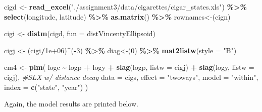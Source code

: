 \documentclass[
  a4paper,
]{article}
\newenvironment{Shaded}{\begin{snugshade}}{\end{snugshade}}
\newcommand{\AttributeTok}[1]{\textcolor[rgb]{0.13,0.29,0.53}{#1}}
\newcommand{\CommentTok}[1]{\textcolor[rgb]{0.56,0.35,0.01}{\textit{#1}}}
\newcommand{\DecValTok}[1]{\textcolor[rgb]{0.00,0.00,0.81}{#1}}
\newcommand{\FloatTok}[1]{\textcolor[rgb]{0.00,0.00,0.81}{#1}}
\newcommand{\FunctionTok}[1]{\textcolor[rgb]{0.13,0.29,0.53}{\textbf{#1}}}
\newcommand{\NormalTok}[1]{#1}
\newcommand{\OtherTok}[1]{\textcolor[rgb]{0.56,0.35,0.01}{#1}}
\newcommand{\SpecialCharTok}[1]{\textcolor[rgb]{0.81,0.36,0.00}{\textbf{#1}}}
\newcommand{\StringTok}[1]{\textcolor[rgb]{0.31,0.60,0.02}{#1}}
\begin{document}
\begin{Shaded}
\begin{Highlighting}[]
\NormalTok{cigd }\OtherTok{\textless{}{-}} \FunctionTok{read\_excel}\NormalTok{(}\StringTok{"./assignment3/data/cigarettes/cigar\_states.xls"}\NormalTok{) }\SpecialCharTok{\%\textgreater{}\%}
    \FunctionTok{select}\NormalTok{(longitude, latitude) }\SpecialCharTok{\%\textgreater{}\%}
    \FunctionTok{as.matrix}\NormalTok{() }\SpecialCharTok{\%\textgreater{}\%}
    \StringTok{\textasciigrave{}}\AttributeTok{rownames\textless{}{-}}\StringTok{\textasciigrave{}}\NormalTok{(cign)}

\NormalTok{cigi }\OtherTok{\textless{}{-}} \FunctionTok{distm}\NormalTok{(cigd, }\AttributeTok{fun =}\NormalTok{ distVincentyEllipsoid)}

\NormalTok{cigj }\OtherTok{\textless{}{-}}\NormalTok{ (cigi}\SpecialCharTok{/}\FloatTok{1e+06}\NormalTok{)}\SpecialCharTok{\^{}}\NormalTok{(}\SpecialCharTok{{-}}\DecValTok{3}\NormalTok{) }\SpecialCharTok{\%\textgreater{}\%}
    \StringTok{\textasciigrave{}}\AttributeTok{diag\textless{}{-}}\StringTok{\textasciigrave{}}\NormalTok{(}\DecValTok{0}\NormalTok{) }\SpecialCharTok{\%\textgreater{}\%}
    \FunctionTok{mat2listw}\NormalTok{(}\AttributeTok{style =} \StringTok{"B"}\NormalTok{)}
\end{Highlighting}
\end{Shaded}

\begin{Shaded}
\begin{Highlighting}[]
\NormalTok{cm4 }\OtherTok{\textless{}{-}} \FunctionTok{plm}\NormalTok{(}
\NormalTok{  logc }\SpecialCharTok{\textasciitilde{}}\NormalTok{ logp }\SpecialCharTok{+}\NormalTok{ logy }\SpecialCharTok{+} \FunctionTok{slag}\NormalTok{(logp, }\AttributeTok{listw =}\NormalTok{ cigj) }\SpecialCharTok{+} \FunctionTok{slag}\NormalTok{(logy, }\AttributeTok{listw =}\NormalTok{ cigj), }\CommentTok{\#SLX w/ distance decay}
  \AttributeTok{data =}\NormalTok{ cigs,}
  \AttributeTok{effect =} \StringTok{"twoways"}\NormalTok{,}
  \AttributeTok{model =} \StringTok{"within"}\NormalTok{,}
  \AttributeTok{index =} \FunctionTok{c}\NormalTok{(}\StringTok{"state"}\NormalTok{, }\StringTok{"year"}\NormalTok{)}
\NormalTok{)}
\end{Highlighting}
\end{Shaded}

Again, the model results are printed below.
\end{document}
